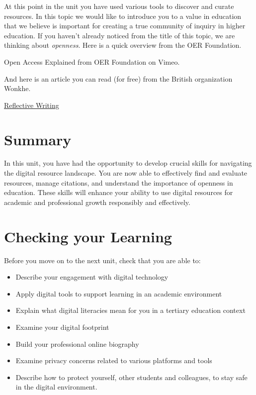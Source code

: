 \documentclass[
]{book}
\providecommand{\tightlist}{%
  \setlength{\itemsep}{0pt}\setlength{\parskip}{0pt}}
\theoremstyle{definition}
\theoremstyle{definition}
\theoremstyle{definition}
\theoremstyle{definition}
\theoremstyle{remark}
\begin{document}
At this point in the unit you have used various tools to discover and curate resources. In this topic we would like to introduce you to a value in education that we believe is important for creating a true community of inquiry in higher education. If you haven't already noticed from the title of this topic, we are thinking about \emph{openness}. Here is a quick overview from the OER Foundation.

Open Access Explained from OER Foundation on Vimeo.

And here is an article you can read (for free) from the British organization Wonkhe.

\href{https://www.youtube.com/watch?v=QoI67VeE3ds}{Reflective Writing}

\hypertarget{summary-1}{%
\section*{Summary}\label{summary-1}}

In this unit, you have had the opportunity to develop crucial skills for navigating the digital resource landscape. You are now able to effectively find and evaluate resources, manage citations, and understand the importance of openness in education. These skills will enhance your ability to use digital resources for academic and professional growth responsibly and effectively.

\hypertarget{checking-your-learning-1}{%
\section*{Checking your Learning}\label{checking-your-learning-1}}

\begin{progress}
Before you move on to the next unit, check that you are able to:

\begin{itemize}
\tightlist
\item
  Describe your engagement with digital technology\\
\item
  Apply digital tools to support learning in an academic environment\\
\item
  Explain what digital literacies mean for you in a tertiary education context\\
\item
  Examine your digital footprint\\
\item
  Build your professional online biography\\
\item
  Examine privacy concerns related to various platforms and tools\\
\item
  Describe how to protect yourself, other students and colleagues, to stay safe in the digital environment.
\end{itemize}
\end{progress}
\end{document}
